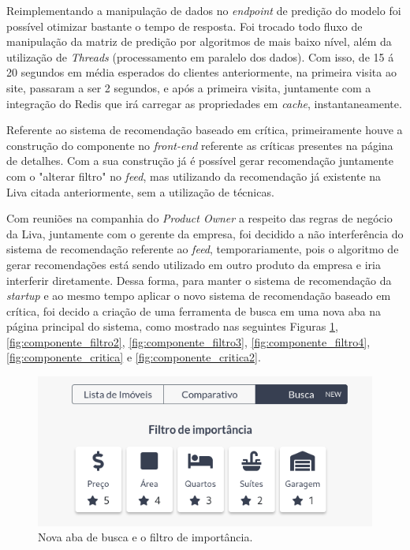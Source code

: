 Reimplementando a manipulação de dados no \textit{endpoint} de predição do modelo foi possível otimizar bastante o tempo de resposta. Foi trocado todo fluxo de manipulação da matriz de predição por algoritmos de mais baixo nível, além da utilização de \textit{Threads} (processamento em paralelo dos dados). Com isso, de 15 á 20 segundos em média esperados do clientes anteriormente, na primeira visita ao site, passaram a ser 2 segundos, e após a primeira visita, juntamente com a integração do Redis que irá carregar as propriedades em \textit{cache}, instantaneamente.

Referente ao sistema de recomendação baseado em crítica, primeiramente houve a construção do componente no \textit{front-end} referente as críticas presentes na página de detalhes. Com a sua construção já é possível gerar recomendação juntamente com o "alterar filtro" no \textit{feed}, mas utilizando da recomendação já existente na Liva citada anteriormente, sem a utilização de técnicas.

Com reuniões na companhia do \textit{Product Owner} a respeito das regras de negócio da Liva, juntamente com o gerente da empresa, foi decidido a não interferência do sistema de recomendação referente ao \textit{feed}, temporariamente, pois o algoritmo de gerar recomendações está sendo utilizado em outro produto da empresa e iria interferir diretamente. Dessa forma, para manter o sistema de recomendação da \textit{startup} e ao mesmo tempo aplicar o novo sistema de recomendação baseado em crítica, foi decido a criação de uma ferramenta de busca em uma nova aba na página principal do sistema, como mostrado nas seguintes Figuras \ref{fig:componente_filtro}, \ref{fig:componente_filtro2}, \ref{fig:componente_filtro3}, \ref{fig:componente_filtro4}, \ref{fig:componente_critica} e \ref{fig:componente_critica2}.

\begin{figure}[H]
    \centering
    \includegraphics[scale=0.5]{figuras/desenvolvimento/componente_filtro.png}
    \caption[Nova aba de busca e o filtro de importância]{Nova aba de busca e o filtro de importância.}
    \label{fig:componente_filtro}
\end{figure}

